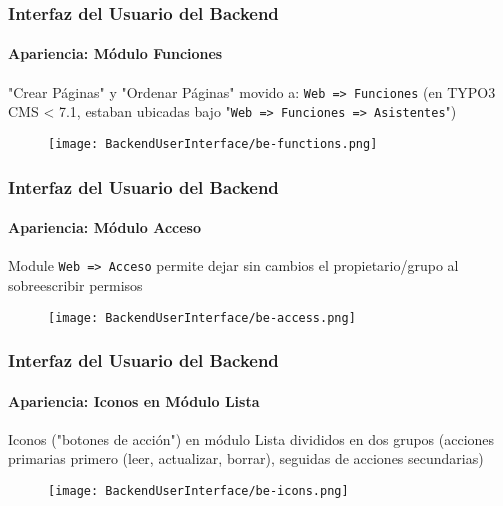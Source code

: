\begin{frame}[fragile]
	\frametitle{Interfaz del Usuario del Backend}
	\framesubtitle{Apariencia: Módulo Funciones}

	"Crear Páginas" y "Ordenar Páginas" movido a: \texttt{Web => Funciones}\newline
	\smaller (en TYPO3 CMS < 7.1, estaban ubicadas bajo "\texttt{Web => Funciones => Asistentes}")

	\begin{figure}
		\texttt{[image: BackendUserInterface/be-functions.png]}
	\end{figure}


\end{frame}


\begin{frame}[fragile]
	\frametitle{Interfaz del Usuario del Backend}
	\framesubtitle{Apariencia: Módulo Acceso}

	Module \texttt{Web => Acceso} permite dejar sin cambios el propietario/grupo\newline
	al sobreescribir permisos

	\begin{figure}
		\texttt{[image: BackendUserInterface/be-access.png]}
	\end{figure}

\end{frame}


\begin{frame}[fragile]
	\frametitle{Interfaz del Usuario del Backend}
	\framesubtitle{Apariencia: Iconos en Módulo Lista}

	Iconos ("botones de acción") en módulo Lista divididos en dos grupos\newline
	\smaller (acciones primarias primero (leer, actualizar, borrar), seguidas de acciones secundarias)

	\begin{figure}
		\texttt{[image: BackendUserInterface/be-icons.png]}
	\end{figure}

\end{frame}

